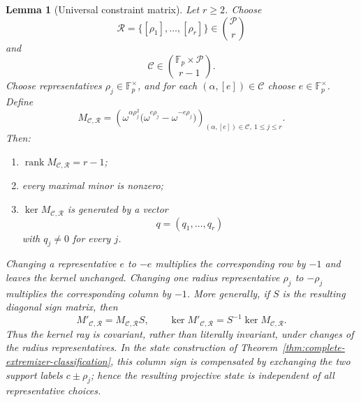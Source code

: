 \documentclass[11pt]{article}
\newtheorem{lemma}[theorem]{Lemma}
\newcommand{\F}{\mathbb F}
\begin{document}
\begin{lemma}[Universal constraint matrix]
\label{lem:complete-constraint-matrix}
Let \(r\ge2\).  Choose
\[
 \mathcal R=\{[\rho_1],\ldots,[\rho_r]\}
 \in\binom{\mathcal P}{r}
\]
and
\[
 \mathcal C\in
 \binom{\F_p\times\mathcal P}{r-1}.
\]
Choose representatives \(\rho_j\in\F_p^\times\), and for each
\((\alpha,[e])\in\mathcal C\) choose \(e\in\F_p^\times\).  Define
\begin{equation}
 M_{\mathcal C,\mathcal R}
 =
 \left(
 \omega^{\alpha\rho_j^2}
 \bigl(\omega^{e\rho_j}-\omega^{-e\rho_j}\bigr)
 \right)_{
 (\alpha,[e])\in\mathcal C,\ 1\le j\le r}.
 \label{eq:complete-constraint-matrix}
\end{equation}
Then:

\begin{enumerate}
\item
\(\operatorname{rank}M_{\mathcal C,\mathcal R}=r-1\);
\item every maximal minor is nonzero;
\item \(\ker M_{\mathcal C,\mathcal R}\) is generated by a vector
\[
 q=(q_1,\ldots,q_r)
\]
with \(q_j\ne0\) for every \(j\).
\end{enumerate}

Changing a representative \(e\) to \(-e\) multiplies the corresponding
row by \(-1\) and leaves the kernel unchanged.  Changing one radius
representative \(\rho_j\) to \(-\rho_j\) multiplies the corresponding column
by \(-1\).  More generally, if \(S\) is the resulting diagonal sign matrix,
then
\[
 M'_{\mathcal C,\mathcal R}=M_{\mathcal C,\mathcal R}S,
 \qquad
 \ker M'_{\mathcal C,\mathcal R}=S^{-1}\ker M_{\mathcal C,\mathcal R}.
\]
Thus the kernel ray is covariant, rather than literally invariant, under
changes of the radius representatives.  In the state construction of
Theorem~\ref{thm:complete-extremizer-classification}, this column sign is
compensated by exchanging the two support labels \(c\pm\rho_j\); hence the
resulting projective state is independent of all representative choices.
\end{lemma}
\end{document}
